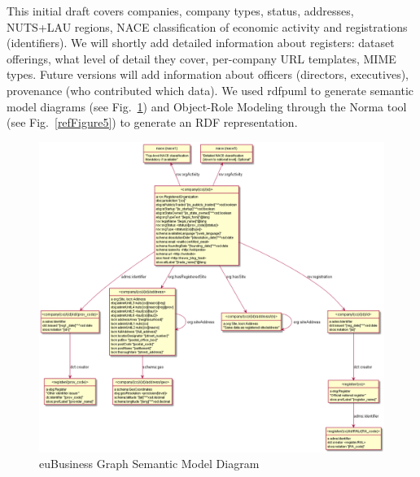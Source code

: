 \documentclass[runningheads,a4paper]{llncs}
\makeatletter
\def\maxwidth#1{\ifdim\Gin@nat@width>#1 #1\else\Gin@nat@width\fi}
\makeatother
\begin{document}
This initial draft covers companies, company types, status, addresses, NUTS+LAU regions, NACE classification of economic activity and registrations (identifiers). We will shortly add detailed information about registers: dataset offerings, what level of detail they cover, per-company URL templates, MIME types. Future versions will add information about officers (directors, executives), provenance (who contributed which data). We used rdfpuml  \cite{_Ref491433543} to generate semantic model diagrams (see Fig.~\ref{refFigure4}) and Object-Role Modeling through the Norma tool  \cite{_Ref491195242} (see Fig.~\ref{refFigure5}) to generate an RDF representation.
\begin{figure}[h!]
\centering
\includegraphics[width=\maxwidth{\textwidth}]{img/100000000000048C00000419A8A0F6AE07037D76.png}
\cprotect\caption{euBusiness Graph Semantic Model Diagram}
\label{refFigure4}
\end{figure}
\end{document}
